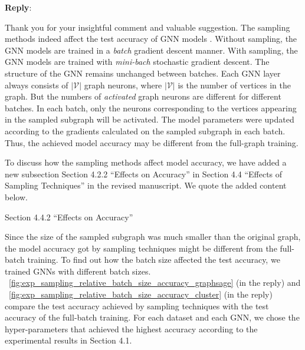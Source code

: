 \documentclass[12pt]{article}
\newenvironment{myquote}[1]%
{\vspace{0.5em}\begin{zitat}{#1}}
{\end{zitat}\vspace{0.5em}}
\newenvironment{reply}
   {\medskip \noindent \textbf{Reply}:\  }
   {\medskip}
\begin{document}
\begin{reply}

    Thank you for your insightful comment and valuable suggestion.
    The sampling methods indeed affect the test accuracy of GNN models \cite{hamilton2017_graphsage, chen2018_fastgcn, chiang2019_cluster_gcn, zeng2020_graphsaint}.%
    Without sampling, the GNN models are trained in a \emph{batch} gradient descent manner.
    With sampling, the GNN models are trained with \emph{mini-bach} stochastic gradient descent.
    The structure of the GNN remains unchanged between batches.
    Each GNN layer always consists of $|\mathcal{V}|$ graph neurons, where $|\mathcal{V}|$ is the number of vertices in the graph.
    But the numbers of \emph{activated} graph neurons are different for different batches.
    In each batch, only the neurons corresponding to the vertices appearing in the sampled subgraph will be activated.
    The model parameters were updated according to the gradients calculated on the sampled subgraph in each batch.
    Thus, the achieved model accuracy may be different from the full-graph training.
    
    To discuss how the sampling methods affect model accuracy, we have added a new subsection Section 4.2.2 ``Effects on Accuracy'' in Section 4.4 ``Effects of Sampling Techniques'' in the revised manuscript.
    We quote the added content below.
    
    \begin{myquote}{Section 4.4.2 ``Effects on Accuracy''}
    
    Since the size of the sampled subgraph was much smaller than the original graph, the model accuracy got by sampling techniques might be different from the full-batch training.
    To find out how the batch size affected the test accuracy, we trained GNNs with different batch sizes.
    \figurename~\ref{fig:exp_sampling_relative_batch_size_accuracy_graphsage} (in the reply) and \figurename~\ref{fig:exp_sampling_relative_batch_size_accuracy_cluster} (in the reply) compare the test accuracy achieved by sampling techniques with the test accuracy of the full-batch training.
    For each dataset and each GNN, we chose the hyper-parameters that achieved the highest accuracy according to the experimental results in Section 4.1.
    

\end{myquote}
\end{reply}
\end{document}
